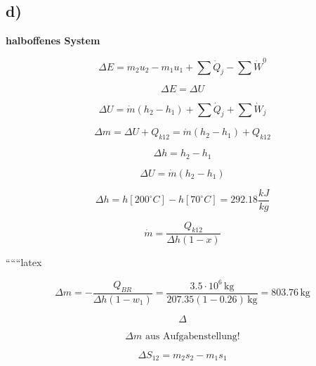

\subsection*{d)}

\textbf{halboffenes System}

\[
\Delta E = m_2 u_2 - m_1 u_1 + \sum \dot{Q}_j - \sum \dot{W}^0
\]

\[
\Delta E = \Delta U
\]

\[
\Delta U = \dot{m} \left( h_2 - h_1 \right) + \sum \dot{Q}_j + \sum \dot{W}_j
\]

\[
\Delta m = \Delta U + Q_{k12} = \dot{m} \left( h_2 - h_1 \right) + Q_{k12}
\]

\[
\Delta h = h_2 - h_1
\]

\[
\Delta U = \dot{m} \left( h_2 - h_1 \right)
\]

\[
\Delta h = h \left[ 200^\circ C \right] - h \left[ 70^\circ C \right] = 292.18 \frac{kJ}{kg}
\]

\[
\dot{m} = \frac{Q_{k12}}{\Delta h \left( 1 - x \right)}
\]

``````latex


\[
\Delta m = -\frac{Q_{BR}}{\Delta h (1 - w_1)} = \frac{3.5 \cdot 10^6 \, \text{kg}}{207.35 (1 - 0.26) \, \text{kg}} = 803.76 \, \text{kg}
\]

\[
\Delta
\]

\[
\Delta m \text{ aus Aufgabenstellung!}
\]

\[
\Delta S_{12} = m_2 s_2 - m_1 s_1
\]

